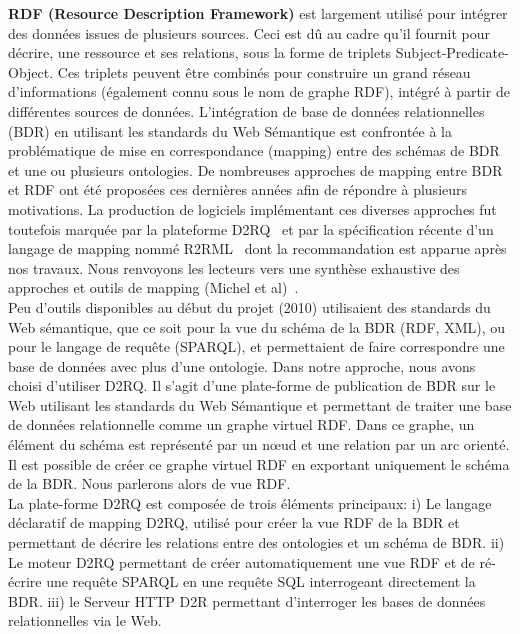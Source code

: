 \textbf{RDF (Resource Description Framework)} est largement utilisé pour intégrer des données issues de plusieurs sources. Ceci est dû au cadre qu'il fournit pour décrire, une ressource et ses relations, sous la forme de triplets Subject-Predicate-Object. Ces triplets peuvent être combinés pour construire un grand réseau d'informations (également connu sous le nom de graphe RDF), intégré à partir de différentes sources de données. 
L'intégration de base de données relationnelles (BDR) en utilisant les standards du Web Sémantique est confrontée à la problématique de mise en correspondance (mapping) entre des schémas de BDR et une ou plusieurs ontologies. De nombreuses approches de mapping entre BDR et RDF ont été proposées ces dernières années afin de répondre à plusieurs motivations. La production de logiciels implémentant ces diverses approches fut toutefois marquée par la plateforme  D2RQ~\cite{Bizer2003,Bizer2004} et par la spécification récente d’un langage de mapping nommé R2RML~\cite{Souripriya} dont la recommandation est apparue après nos travaux. Nous renvoyons les lecteurs vers une synthèse exhaustive des approches et outils de mapping (Michel et al)~\cite{Antipolis2014}.\\

Peu d’outils disponibles au début du projet (2010) utilisaient des standards du Web sémantique, que ce soit pour la vue du schéma de la BDR (RDF, XML), ou pour le langage de requête (SPARQL), et permettaient de faire correspondre une base de données avec plus d’une ontologie. Dans notre approche, nous avons choisi d'utiliser D2RQ. Il s'agit d'une plate-forme de publication de BDR sur le Web utilisant les standards du Web Sémantique et permettant de traiter une base de données relationnelle comme un graphe virtuel RDF. Dans ce graphe, un élément du schéma est représenté par un n\oe ud et une relation par un arc orienté. Il est possible de créer ce graphe virtuel RDF en exportant uniquement le schéma de la BDR. Nous parlerons alors de vue RDF. \\

La plate-forme D2RQ est composée de trois éléments principaux: i) Le langage déclaratif de mapping D2RQ, utilisé pour créer la vue RDF de la BDR et permettant de décrire les relations entre des ontologies et un schéma de BDR. ii) Le moteur D2RQ permettant de créer automatiquement une vue RDF et de ré-écrire une requête SPARQL en une requête SQL interrogeant directement la BDR. iii) le Serveur HTTP D2R permettant d’interroger les bases de données relationnelles via le Web.\\

